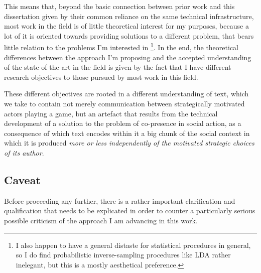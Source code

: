 This means that, beyond the basic connection between prior work and this dissertation given by their common reliance on the same technical infrastructure, most work in the field is of little theoretical interest for my purposes, because a lot of it is oriented towards providing solutions to a different problem, that bears little relation to the problems I'm interested in
\footnote{
    \label{foot:stats}
    I also happen to have a general distaste for statistical procedures in general, so I do find probabilistic inverse-sampling procedures like LDA rather inelegant, but this is a mostly aesthetical preference.
}.
In the end, the theoretical differences between the approach I'm proposing and the accepted understanding of the state of the art in the field is given by the fact that I have different research objectives to those pursued by most work in this field.

These different objectives are rooted in a different understanding of text, which we take to contain not merely communication between strategically motivated actors playing a game, but an artefact that results from the technical development of a solution to the problem of co-presence in social action, as a consequence of which text encodes within it a big chunk of the social context in which it is produced \emph{more or less independently of the motivated strategic choices of its author}.

\subsection{Caveat}

Before proceeding any further, there is a rather important clarification and qualification that needs to be explicated in order to counter a particularly serious possible criticism of the approach I am advancing in this work.

